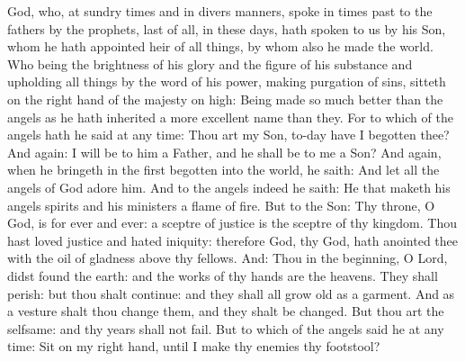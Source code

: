 



God, who, at sundry times and in divers manners, spoke in times past to the
fathers by the prophets, last of all, in these days, hath spoken to us by his
Son, whom he hath appointed heir of all things, by whom also he made the world.
Who being the brightness of his glory and the figure of
his substance and upholding all things by the word of his power, making
purgation of sins, sitteth on the right hand of the majesty on
high: Being made so much better than the angels as he hath inherited a more
excellent name than they.  For to which of the angels hath he said at any time:
Thou art my Son, to-day have I begotten thee? And again: I will be to him a
Father, and he shall be to me a Son?  And again, when he bringeth in the first
begotten into the world, he saith: And let all the angels of God adore him.
And to the angels indeed he saith: He that maketh his angels spirits and his
ministers a flame of fire.  But to the Son: Thy throne, O God, is for ever and
ever: a sceptre of justice is the sceptre of thy kingdom.  Thou hast loved
justice and hated iniquity: therefore God, thy God, hath anointed thee with the
oil of gladness above thy fellows.  And: Thou in the beginning, O Lord, didst
found the earth: and the works of thy hands are the heavens.  They shall
perish: but thou shalt continue: and they shall all grow old as a garment.  And
as a vesture shalt thou change them, and they shalt be changed. But thou art
the selfsame: and thy years shall not fail.  But to which of the angels said he
at any time: Sit on my right hand, until I make thy enemies thy footstool?




